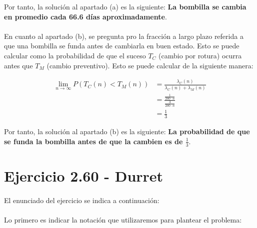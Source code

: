 \documentclass[a4paper, spanish]{article}
\begin{document}
  Por tanto, la solución al apartado (a) es la siguiente: \textbf{La bombilla se cambia en promedio cada 66.6 días aproximadamente}.

  \paragraph{}
  En cuanto al apartado (b), se pregunta pro la fracción a largo plazo referida a que una bombilla se funda antes de cambiarla en buen estado. Esto se puede calcular como la probabilidad de que el suceso $T_C$ (cambio por rotura) ocurra antes que $T_M$ (cambio preventivo). Esto se puede calcular de la siguiente manera:

  \begin{align*}
    \lim_{n\to\infty} P(T_C(n) < T_M(n))
    &= \frac{\lambda_C(n)}{\lambda_C(n) + \lambda_M(n)} \\
    &= \frac{\frac{1}{200 \cdot n}}{\frac{3}{200 \cdot n}}\\
    &= \frac{1}{3}
  \end{align*}

    Por tanto, la solución al apartado (b) es la siguiente: \textbf{La probabilidad de que se funda la bombilla antes de que la cambien es de $\frac{1}{3}$}.


  \section{Ejercicio 2.60 - Durret}

    \paragraph{}
    El enunciado del ejercicio se indica a continuación:


    \begin{displayquote}
    \end{displayquote}


    \paragraph{}
    Lo primero es indicar la notación que utilizaremos para plantear el problema:
\end{document}
